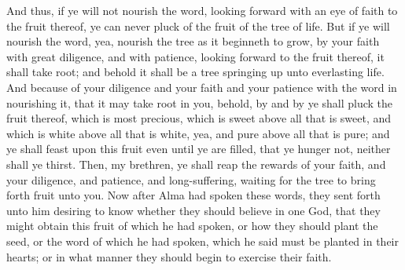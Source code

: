 And thus, if ye will not nourish the word, looking forward with an eye of faith to the fruit thereof, ye can never pluck of the fruit of the tree of life.
\bverse \iffalse But if ye will nourish the word, yea, nourish the tree as it beginneth to grow, by your faith with great diligence, and with patience, looking forward to the fruit thereof, it shall take root; and behold it shall be a tree springing up unto everlasting life. \fi
But if ye will nourish the word, yea, nourish the tree as it beginneth to grow, by your faith with great diligence, and with patience, looking forward to the fruit thereof, it shall take root; and behold it shall be a tree springing up unto everlasting life.
\bverse \iffalse And because of your diligence and your faith and your patience with the word in nourishing it, that it may take root in you, behold, by and by ye shall pluck the fruit thereof, which is most precious, which is sweet above all that is sweet, and which is white above all that is white, yea, and pure above all that is pure; and ye shall feast upon this fruit even until ye are filled, that ye hunger not, neither shall ye thirst. \fi
And because of your diligence and your faith and your patience with the word in nourishing it, that it may take root in you, behold, by and by ye shall pluck the fruit thereof, which is most precious, which is sweet above all that is sweet, and which is white above all that is white, yea, and pure above all that is pure; and ye shall feast upon this fruit even until ye are filled, that ye hunger not, neither shall ye thirst.
\bverse \iffalse Then, my brethren, ye shall reap the rewards of your faith, and your diligence, and patience, and long-suffering, waiting for the tree to bring forth fruit unto you. \fi
Then, my brethren, ye shall reap the rewards of your faith, and your diligence, and patience, and long-suffering, waiting for the tree to bring forth fruit unto you.
\bchapter
\bverse \iffalse Now after Alma had spoken these words, they sent forth unto him desiring to know whether they should believe in one God, that they might obtain this fruit of which he had spoken, or how they should plant the seed, or the word of which he had spoken, which he said must be planted in their hearts; or in what manner they should begin to exercise their faith. \fi
Now after Alma had spoken these words, they sent forth unto him desiring to know whether they should believe in one God, that they might obtain this fruit of which he had spoken, or how they should plant the seed, or the word of which he had spoken, which he said must be planted in their hearts; or in what manner they should begin to exercise their faith.
